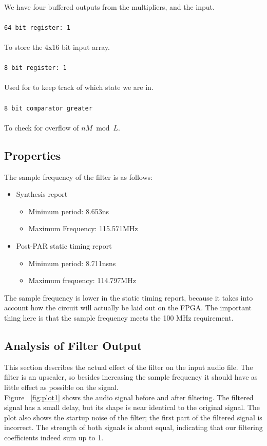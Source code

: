 \\
We have four buffered outputs from the multipliers, and the input.\\
\\
\texttt{64 bit register: 1}\\
\\
To store the 4x16 bit input array.\\
\\
\texttt{8 bit register: 1}\\
\\
Used for to keep track of which state we are in.\\
\\
\texttt{8 bit comparator greater}\\
\\
To check for overflow of $nM \bmod L$.
\subsection{Properties}
The sample frequency of the filter is as follows:
\begin{itemize}
\item
Synthesis report
\begin{itemize}
\item Minimum period: 8.653ns
\item Maximum Frequency: 115.571MHz
\end{itemize}
\item
Post-PAR static timing report
\begin{itemize}
\item  Minimum period:   8.711nsns  
\item Maximum frequency: 114.797MHz
\end{itemize}
\end{itemize}
The sample frequency is lower in the static timing report, because it takes into account how the circuit will actually be laid out on the FPGA. The important thing here is that the sample frequency meets the 100 MHz requirement.
\subsection{Analysis of Filter Output }
This section describes the actual effect of the filter on the input audio file. The filter is an upscaler, so besides increasing the sample frequency it should have as little effect as possible on the signal.\\

Figure ~\ref{fig:plot1} shows the audio signal before and after filtering. The filtered signal has a small delay, but its shape is near identical to the original signal. The plot also shows the startup noise of the filter; the first part of the filtered signal is  incorrect. The strength of both signals is about equal, indicating that our filtering coefficients indeed sum up to 1. \\

